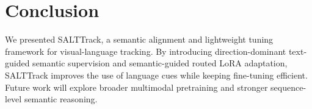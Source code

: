 \section{Conclusion}
We presented SALTTrack, a semantic alignment and lightweight tuning framework for visual-language tracking. By introducing direction-dominant text-guided semantic supervision and semantic-guided routed LoRA adaptation, SALTTrack improves the use of language cues while keeping fine-tuning efficient. Future work will explore broader multimodal pretraining and stronger sequence-level semantic reasoning.
